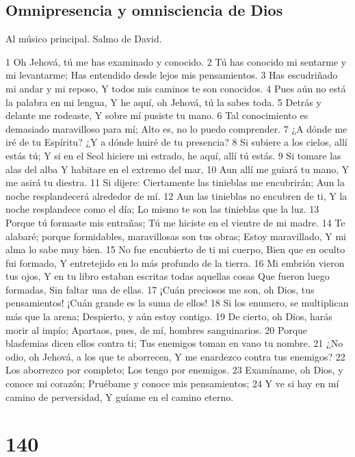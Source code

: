 \section*{Omnipresencia y omnisciencia de Dios}

Al músico principal. Salmo de David.

1 Oh Jehová, tú me has examinado y conocido.
2 Tú has conocido mi sentarme y mi levantarme;
Has entendido desde lejos mis pensamientos.
3 Has escudriñado mi andar y mi reposo,
Y todos mis caminos te son conocidos.
4 Pues aún no está la palabra en mi lengua,
Y he aquí, oh Jehová, tú la sabes toda.
5 Detrás y delante me rodeaste,
Y sobre mí pusiste tu mano.
6 Tal conocimiento es demasiado maravilloso para mí;
Alto es, no lo puedo comprender.
7 ¿A dónde me iré de tu Espíritu?
¿Y a dónde huiré de tu presencia?
8 Si subiere a los cielos, allí estás tú;
Y si en el Seol hiciere mi estrado, he aquí, allí tú estás.
9 Si tomare las alas del alba
Y habitare en el extremo del mar,
10 Aun allí me guiará tu mano,
Y me asirá tu diestra.
11 Si dijere: Ciertamente las tinieblas me encubrirán;
Aun la noche resplandecerá alrededor de mí.
12 Aun las tinieblas no encubren de ti,
Y la noche resplandece como el día;
Lo mismo te son las tinieblas que la luz.
13 Porque tú formaste mis entrañas;
Tú me hiciste en el vientre de mi madre.
14 Te alabaré; porque formidables, maravillosas son tus obras;
Estoy maravillado,
Y mi alma lo sabe muy bien.
15 No fue encubierto de ti mi cuerpo,
Bien que en oculto fui formado,
Y entretejido en lo más profundo de la tierra.
16 Mi embrión vieron tus ojos,
Y en tu libro estaban escritas todas aquellas cosas
Que fueron luego formadas,
Sin faltar una de ellas.
17 ¡Cuán preciosos me son, oh Dios, tus pensamientos!
¡Cuán grande es la suma de ellos!
18 Si los enumero, se multiplican más que la arena;
Despierto, y aún estoy contigo.
19 De cierto, oh Dios, harás morir al impío;
Apartaos, pues, de mí, hombres sanguinarios.
20 Porque blasfemias dicen ellos contra ti;
Tus enemigos toman en vano tu nombre.
21 ¿No odio, oh Jehová, a los que te aborrecen,
Y me enardezco contra tus enemigos?
22 Los aborrezco por completo;
Los tengo por enemigos.
23 Examíname, oh Dios, y conoce mi corazón;
Pruébame y conoce mis pensamientos;
24 Y ve si hay en mí camino de perversidad,
Y guíame en el camino eterno.

\chapter{140}

